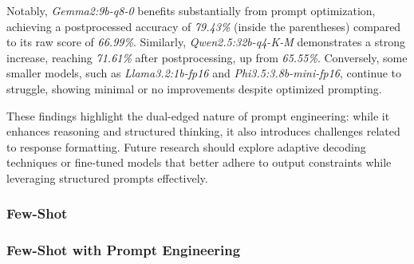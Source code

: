 Notably, \textit{Gemma2:9b-q8-0} benefits substantially from prompt optimization, achieving a postprocessed accuracy of \textit{79.43\%} (inside the parentheses) compared to its raw score of \textit{66.99\%}. Similarly, \textit{Qwen2.5:32b-q4-K-M} demonstrates a strong increase, reaching \textit{71.61\%} after postprocessing, up from \textit{65.55\%}. Conversely, some smaller models, such as \textit{Llama3.2:1b-fp16} and \textit{Phi3.5:3.8b-mini-fp16}, continue to struggle, showing minimal or no improvements despite optimized prompting.

These findings highlight the dual-edged nature of prompt engineering: while it enhances reasoning and structured thinking, it also introduces challenges related to response formatting. Future research should explore adaptive decoding techniques or fine-tuned models that better adhere to output constraints while leveraging structured prompts effectively.

\subsubsection{Few-Shot}

\subsubsection{Few-Shot with Prompt Engineering}
